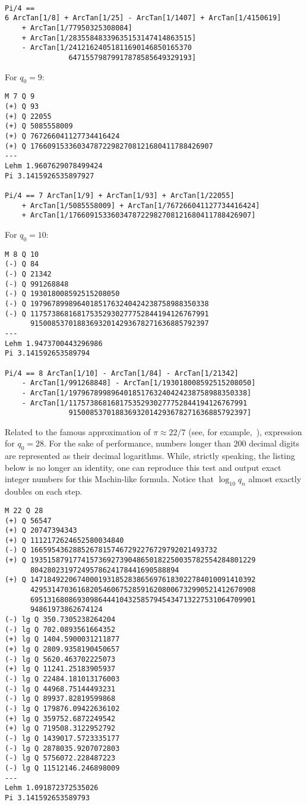 \documentclass[draft, 10pt]{article} %
\begin{document}
\begin{verbatim}

Pi/4 ==
6 ArcTan[1/8] + ArcTan[1/25] - ArcTan[1/1407] + ArcTan[1/4150619]
    + ArcTan[1/77950325308084]
    + ArcTan[1/28355848339635153147414863515]
    - ArcTan[1/24121624051811690146850165370
               64715579879917878585649329193]
\end{verbatim}

For $q_0=9$:
\begin{verbatim}
M 7 Q 9
(+) Q 93
(+) Q 22055
(+) Q 5085558009
(+) Q 767266041127734416424
(+) Q 1766091533603478722982708121680411788426907
---
Lehm 1.9607629078499424 
Pi 3.1415926535897927

Pi/4 == 7 ArcTan[1/9] + ArcTan[1/93] + ArcTan[1/22055]
    + ArcTan[1/5085558009] + ArcTan[1/767266041127734416424]
    + ArcTan[1/1766091533603478722982708121680411788426907]
\end{verbatim}

\pagebreak
For $q_0=10$:
\begin{verbatim}
M 8 Q 10
(-) Q 84
(-) Q 21342
(-) Q 991268848
(-) Q 193018008592515208050
(-) Q 197967899896401851763240424238758988350338
(-) Q 117573868168175352930277752844194126767991
      915008537018836932014293678271636885792397
---
Lehm 1.9473700443296986 
Pi 3.141592653589794

Pi/4 == 8 ArcTan[1/10] - ArcTan[1/84] - ArcTan[1/21342]
    - ArcTan[1/991268848] - ArcTan[1/193018008592515208050]
    - ArcTan[1/197967899896401851763240424238758988350338]
    - ArcTan[1/117573868168175352930277752844194126767991
               915008537018836932014293678271636885792397]
\end{verbatim}

Related to the famous approximation of $\pi \approx 22/7$ (see, for example,~\cite{source-pi}),
expression for $q_0 = 28$. For the sake of performance, numbers longer than $200$ decimal digits
are represented as their decimal logarithms. While, strictly speaking, the listing below is no longer
an identity, one can reproduce this test and output exact integer numbers for this Machin-like
formula.
Notice that $\log_{10} q_n$ almost exactly doubles on each step.
\begin{verbatim}
M 22 Q 28
(+) Q 56547
(+) Q 20747394343
(+) Q 1112172624652580034840
(-) Q 16659543628852678157467292276729792021493732
(+) Q 19351587917741573692739048650182250035782554284801229
      80428023197249578624178441690588894
(+) Q 14718492206740001931852838656976183022784010091410392
      42953147036168205460675285916208006732990521412670908
      69513168086930986444104325857945434713227531064709901
      94861973862674124
(-) lg Q 350.7305238264204
(-) lg Q 702.0893561664352
(+) lg Q 1404.5900031211877
(+) lg Q 2809.9358190450657
(-) lg Q 5620.463702225073
(+) lg Q 11241.25183905937
(-) lg Q 22484.181013176003
(-) lg Q 44968.75144493231
(-) lg Q 89937.82819599868
(-) lg Q 179876.09422636102
(+) lg Q 359752.6872249542
(+) lg Q 719508.3122952792
(-) lg Q 1439017.5723335177
(-) lg Q 2878035.9207072803
(-) lg Q 5756072.228487223
(-) lg Q 11512146.246898009
---
Lehm 1.091872372535026 
Pi 3.141592653589793
\end{verbatim}
\end{document}
